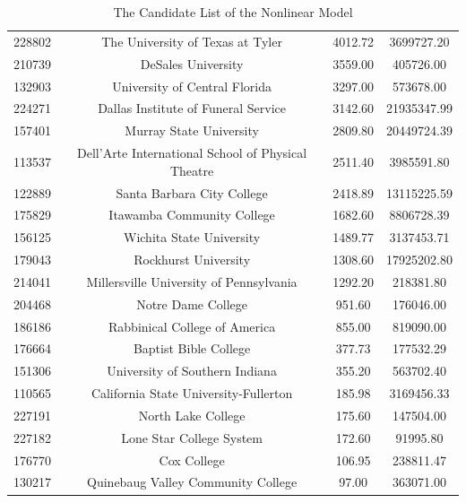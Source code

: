 \documentclass{mcmthesis}
\begin{document}
\begin{appendices}
\begin{table}
\caption{The Candidate List of the Nonlinear Model}
\begin{tabular}{c c c c}
\hline
228802 &                             The University of Texas at Tyler & 4012.72 & 3699727.20\\
210739 &                                           DeSales University & 3559.00 & 405726.00\\
132903 &                                University of Central Florida & 3297.00 & 573678.00\\
224271 &                          Dallas Institute of Funeral Service & 3142.60 & 21935347.99\\
157401 &                                      Murray State University & 2809.80 & 20449724.39\\
113537 &           Dell'Arte International School of Physical Theatre & 2511.40 & 3985591.80\\
122889 &                                   Santa Barbara City College & 2418.89 & 13115225.59\\
175829 &                                   Itawamba Community College & 1682.60 & 8806728.39\\
156125 &                                     Wichita State University & 1489.77 & 3137453.71\\
179043 &                                         Rockhurst University & 1308.60 & 17925202.80\\
214041 &                      Millersville University of Pennsylvania & 1292.20 & 218381.80\\
204468 &                                           Notre Dame College & 951.60 & 176046.00\\
186186 &                                Rabbinical College of America & 855.00 & 819090.00\\
176664 &                                        Baptist Bible College & 377.73 & 177532.29\\
151306 &                               University of Southern Indiana & 355.20 & 563702.40\\
110565 &                        California State University-Fullerton & 185.98 & 3169456.33\\
227191 &                                           North Lake College & 175.60 & 147504.00\\
227182 &                                     Lone Star College System & 172.60 & 91995.80\\
176770 &                                                  Cox College & 106.95 & 238811.47\\
130217 &                           Quinebaug Valley Community College & 97.00 & 363071.00\\
\hline
\end{tabular}
\end{table}

\end{appendices}
\end{document}
